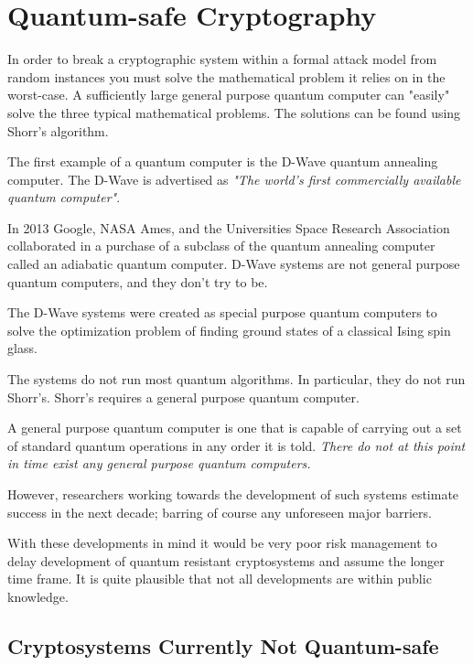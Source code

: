 \section{Quantum-safe Cryptography}

In order to break a cryptographic system within a formal attack model from random instances you must solve the mathematical problem it relies on in the worst-case. A sufficiently large general purpose quantum computer can "easily" solve the three typical mathematical problems. The solutions can be found using Shorr’s algorithm.

The first example of a quantum computer is the D-Wave quantum annealing computer. The D-Wave is advertised as 
\textit{"The world's first commercially available quantum computer"}. 
 
In 2013 Google, NASA Ames, and the Universities Space Research Association collaborated in a purchase of a subclass of the quantum annealing computer called an adiabatic quantum computer.  
D-Wave systems are not general purpose quantum computers, and they don't try to be.
 
The D-Wave systems were created as special purpose quantum computers to solve the optimization problem of finding ground states of a classical Ising spin glass. 
  
The systems do not run most quantum algorithms. In particular, they do not run Shorr’s.
Shorr’s requires a general purpose quantum computer. 
 
A general purpose quantum computer is one that is capable of carrying out a set of standard quantum operations in any order it is told.
\textit{There do not at this point in time exist any general purpose quantum computers.} 

However, researchers working towards the development of such systems estimate success in the next decade; barring of course any unforeseen major barriers.  
 
With these developments in mind it would be very poor risk management to delay development of quantum resistant cryptosystems and assume the longer time frame. It is quite plausible that not all developments are within public knowledge. 

\subsection{Cryptosystems Currently Not Quantum-safe }


